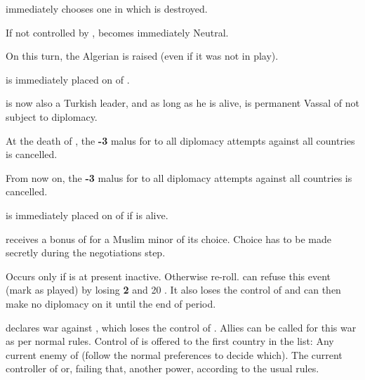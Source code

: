 \phevnt
\aparag \TUR immediately chooses one \Presidio in \paysAlgerie which is
destroyed.

\aparag If not controlled by \TUR, \paysAlgerie becomes immediately Neutral.

\aparag On this turn, the Algerian \corsaire is raised \faceplus (even if it
was not in play).

\phevnt
\aparag \paysAlgerie is immediately placed on \VASSAL of \TUR.

\aparag \leaderBarbaros is now also a Turkish leader, and as long as he is
alive, \paysAlgerie is permanent Vassal of \TUR not subject to diplomacy.

\aparag At the death of \leaderBarbaros, the {\bf -3} malus for \TUR to all
diplomacy attempts against all  countries is cancelled.


\phevnt
\aparag From now on, the {\bf -3} malus for \TUR to all diplomacy attempts
against all  countries is cancelled.

\aparag \paysTunisie is immediately placed on \VASSAL of \TUR if \leaderDragut
is alive.

\phdipl
\aparag \TUR receives a bonus of  for a Muslim minor of its
choice. Choice has to be made secretly during the negotiations step.



\condition{}
\aparag Occurs only if \paysecosse is at present inactive. Otherwise re-roll.
\aparag \ENG can refuse this event (mark as played) by losing {\bf 2} \STAB
and 20 \VP. It also loses the control of \paysecosse and can then make no
diplomacy on it until the end of period.

\phevnt
\aparag \paysecosse declares war against \ENG, which loses the control of
\paysecosse.
\aparag Allies can be called for this war as per normal rules.
\aparag Control of \paysecosse is offered to the first country in the list:
\bparag Any current enemy of \ENG (follow the normal preferences to decide
which).
\bparag The current controller of \paysecosse or, failing that, another power,
according to the usual rules.

